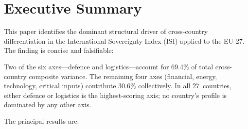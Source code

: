 \section*{Executive Summary}\label{sec:executive-summary}

This paper identifies the dominant structural driver of cross-country
differentiation in the International Sovereignty Index (ISI) applied to
the EU-27.  The finding is concise and falsifiable:

\begin{tcolorbox}[
  colback=ISILight,
  colframe=ISIBlue,
  fonttitle=\bfseries\sffamily,
  title={Core finding}
]
Two of the six {\ISI} axes---defence and logistics---account for
69.4\% of total cross-country composite variance.  The remaining four
axes (financial, energy, technology, critical inputs) contribute
30.6\% collectively.  In all 27~countries, either defence or logistics
is the highest-scoring axis; no country's profile is dominated by any
other axis.
\end{tcolorbox}

\medskip
\noindent
The principal results are:


